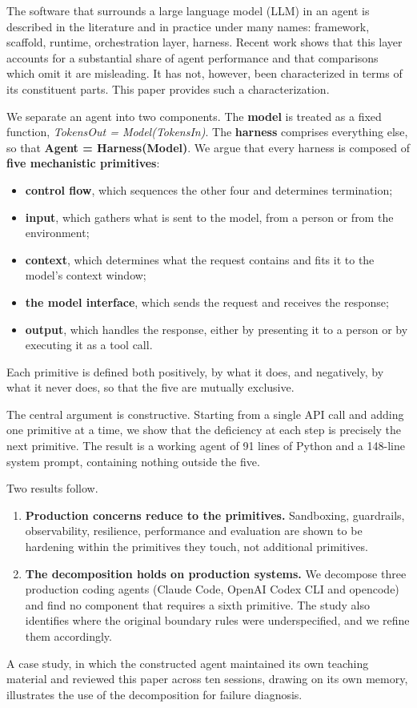 The software that surrounds a large language model (LLM) in an agent is described in the literature and in practice under many names: framework, scaffold, runtime, orchestration layer, harness. Recent work shows that this layer accounts for a substantial share of agent performance and that comparisons which omit it are misleading. It has not, however, been characterized in terms of its constituent parts. This paper provides such a characterization.

We separate an agent into two components. The \textbf{model} is treated as a fixed function, \emph{TokensOut = Model(TokensIn)}. The \textbf{harness} comprises everything else, so that \textbf{Agent = Harness(Model)}. We argue that every harness is composed of \textbf{five mechanistic primitives}:

\begin{itemize}
\tightlist
\item
  \textbf{control flow}, which sequences the other four and determines termination;
\item
  \textbf{input}, which gathers what is sent to the model, from a person or from the environment;
\item
  \textbf{context}, which determines what the request contains and fits it to the model's context window;
\item
  \textbf{the model interface}, which sends the request and receives the response;
\item
  \textbf{output}, which handles the response, either by presenting it to a person or by executing it as a tool call.
\end{itemize}

Each primitive is defined both positively, by what it does, and negatively, by what it never does, so that the five are mutually exclusive.

The central argument is constructive. Starting from a single API call and adding one primitive at a time, we show that the deficiency at each step is precisely the next primitive. The result is a working agent of 91 lines of Python and a 148-line system prompt, containing nothing outside the five.

Two results follow.

\begin{enumerate}
\def\labelenumi{\arabic{enumi}.}
\tightlist
\item
  \textbf{Production concerns reduce to the primitives.} Sandboxing, guardrails, observability, resilience, performance and evaluation are shown to be hardening within the primitives they touch, not additional primitives.
\item
  \textbf{The decomposition holds on production systems.} We decompose three production coding agents (Claude Code, OpenAI Codex CLI and opencode) and find no component that requires a sixth primitive. The study also identifies where the original boundary rules were underspecified, and we refine them accordingly.
\end{enumerate}

A case study, in which the constructed agent maintained its own teaching material and reviewed this paper across ten sessions, drawing on its own memory, illustrates the use of the decomposition for failure diagnosis.

